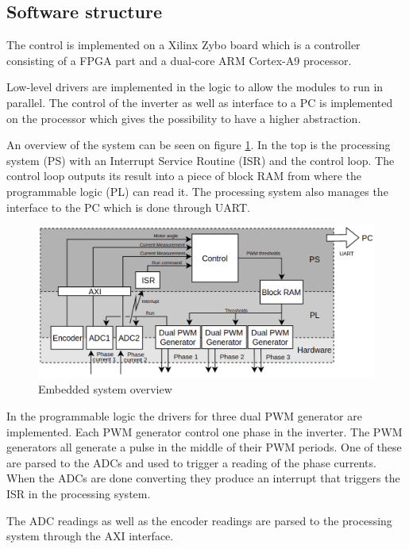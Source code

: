 \subsection{Software structure}
The control is implemented on a Xilinx Zybo board which is a controller consisting of a FPGA part and a dual-core ARM Cortex-A9 processor.

Low-level drivers are implemented in the logic to allow the modules to run in parallel. The control of the inverter as well as interface to a PC is implemented on the processor which gives the possibility to have a higher abstraction. 

An overview of the system can be seen on figure \ref{fig:embedded_overview}. In the top is the processing system (PS) with an Interrupt Service Routine (ISR) and the control loop. The control loop outputs its result into a piece of block RAM from where the programmable logic (PL) can read it. The processing system also manages the interface to the PC which is done through UART.

\begin{figure}[H]
	\centering
	\includegraphics[width=1\linewidth]{pictures/software/embedded_overview.png}
	\caption{Embedded system overview}
	\label{fig:embedded_overview}
\end{figure}


In the programmable logic the drivers for three dual PWM generator are implemented. Each PWM generator control one phase in the inverter. The PWM generators all generate a pulse in the middle of their PWM periods. One of these are parsed to the ADCs and used to trigger a reading of the phase currents. When the ADCs are done converting they produce an interrupt that triggers the ISR in the processing system.

The ADC readings as well as the encoder readings are parsed to the processing system through the AXI interface.



